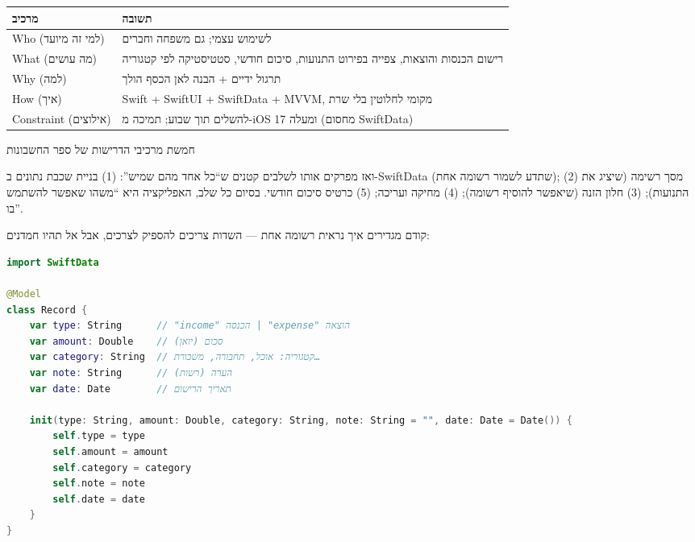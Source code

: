 


\begin{center}
\begin{tabularx}{\linewidth}{|X|X|}
\hline
\textbf{מרכיב} & \textbf{תשובה} \tabularnewline
\hline
Who (למי זה מיועד) & לשימוש עצמי; גם משפחה וחברים \tabularnewline
What (מה עושים) & רישום הכנסות והוצאות, צפייה בפירוט התנועות, סיכום חודשי, סטטיסטיקה לפי קטגוריה \tabularnewline
Why (למה) & תרגול ידיים + הבנה לאן הכסף הולך \tabularnewline
How (איך) & Swift + SwiftUI + SwiftData + MVVM, מקומי לחלוטין בלי שרת \tabularnewline
Constraint (אילוצים) & להשלים תוך שבוע; תמיכה מ-iOS 17 ומעלה (מחסום SwiftData) \tabularnewline
\hline
\end{tabularx}
\end{center}

\begin{center}\small\color{gray}חמשת מרכיבי הדרישות של ספר החשבונות\end{center}

ואז מפרקים אותו לשלבים קטנים ש“כל אחד מהם שמיש”: (1) בניית שכבת נתונים ב-SwiftData (שתדע לשמור רשומה אחת); (2) מסך רשימה (שיציג את התנועות); (3) חלון הזנה (שיאפשר להוסיף רשומה); (4) מחיקה ועריכה; (5) כרטיס סיכום חודשי. בסיום כל שלב, האפליקציה היא “משהו שאפשר להשתמש בו”.


קודם מגדירים איך נראית רשומה אחת — השדות צריכים להספיק לצרכים, אבל אל תהיו חמדנים:

\begin{lstlisting}[language=Swift]
import SwiftData

@Model
class Record {
    var type: String      // "income" הכנסה | "expense" הוצאה
    var amount: Double    // סכום (יואן)
    var category: String  // קטגוריה: אוכל, תחבורה, משכורת…
    var note: String      // הערה (רשות)
    var date: Date        // תאריך הרישום

    init(type: String, amount: Double, category: String, note: String = "", date: Date = Date()) {
        self.type = type
        self.amount = amount
        self.category = category
        self.note = note
        self.date = date
    }
}
\end{lstlisting}

